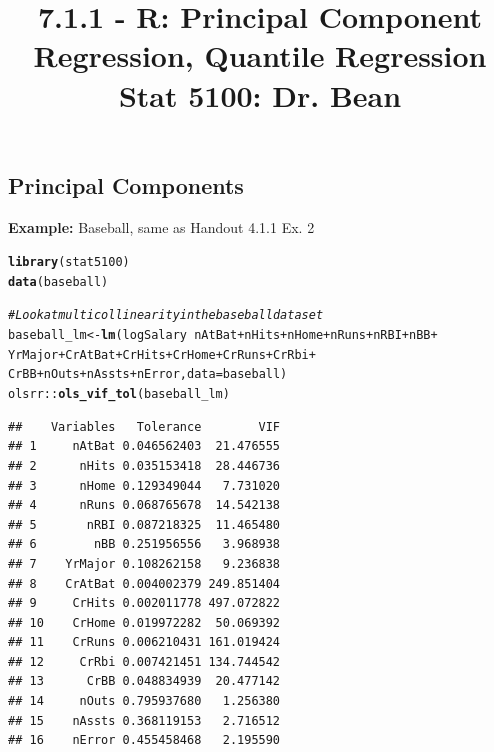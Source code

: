 \documentclass{article}\usepackage[]{graphicx}\usepackage[]{color}
\makeatletter
\newcommand{\hlcom}[1]{\textcolor[rgb]{0.678,0.584,0.686}{\textit{#1}}}%
\newcommand{\hlopt}[1]{\textcolor[rgb]{0,0,0}{#1}}%
\newcommand{\hlstd}[1]{\textcolor[rgb]{0.345,0.345,0.345}{#1}}%
\newcommand{\hlkwb}[1]{\textcolor[rgb]{0.69,0.353,0.396}{#1}}%
\newcommand{\hlkwc}[1]{\textcolor[rgb]{0.333,0.667,0.333}{#1}}%
\newcommand{\hlkwd}[1]{\textcolor[rgb]{0.737,0.353,0.396}{\textbf{#1}}}%
\newenvironment{kframe}{%
 \def\at@end@of@kframe{}%
 \ifinner\ifhmode%
  \def\at@end@of@kframe{\end{minipage}}%
  \begin{minipage}{\columnwidth}%
 \fi\fi%
 \def\FrameCommand##1{\hskip\@totalleftmargin \hskip-\fboxsep
 \colorbox{shadecolor}{##1}\hskip-\fboxsep
     \hskip-\linewidth \hskip-\@totalleftmargin \hskip\columnwidth}%
 \MakeFramed {\advance\hsize-\width
   \@totalleftmargin\z@ \linewidth\hsize
   \@setminipage}}%
 {\par\unskip\endMakeFramed%
 \at@end@of@kframe}
\newenvironment{knitrout}{}{} %
\makeatother
\begin{document}
\title{%
  7.1.1 - R: Principal Component Regression, Quantile Regression \\
  \smallskip
  \large Stat 5100: Dr. Bean
}
\date{}

\maketitle

\subsection{Principal Components}

\textbf{Example:} Baseball, same as Handout 4.1.1 Ex. 2

\begin{knitrout}
\color{fgcolor}\begin{kframe}
\begin{alltt}
\hlkwd{library}\hlstd{(stat5100)}
\hlkwd{data}\hlstd{(baseball)}

\hlcom{# Look at multicollinearity in the baseball dataset}
\hlstd{baseball_lm} \hlkwb{<-} \hlkwd{lm}\hlstd{(logSalary} \hlopt{~} \hlstd{nAtBat} \hlopt{+} \hlstd{nHits} \hlopt{+} \hlstd{nHome} \hlopt{+} \hlstd{nRuns} \hlopt{+} \hlstd{nRBI} \hlopt{+} \hlstd{nBB} \hlopt{+}
                    \hlstd{YrMajor} \hlopt{+} \hlstd{CrAtBat} \hlopt{+} \hlstd{CrHits} \hlopt{+} \hlstd{CrHome} \hlopt{+} \hlstd{CrRuns} \hlopt{+} \hlstd{CrRbi} \hlopt{+}
                    \hlstd{CrBB} \hlopt{+} \hlstd{nOuts} \hlopt{+} \hlstd{nAssts} \hlopt{+} \hlstd{nError,} \hlkwc{data} \hlstd{= baseball)}
\hlstd{olsrr}\hlopt{::}\hlkwd{ols_vif_tol}\hlstd{(baseball_lm)}
\end{alltt}
\begin{verbatim}
##    Variables   Tolerance        VIF
## 1     nAtBat 0.046562403  21.476555
## 2      nHits 0.035153418  28.446736
## 3      nHome 0.129349044   7.731020
## 4      nRuns 0.068765678  14.542138
## 5       nRBI 0.087218325  11.465480
## 6        nBB 0.251956556   3.968938
## 7    YrMajor 0.108262158   9.236838
## 8    CrAtBat 0.004002379 249.851404
## 9     CrHits 0.002011778 497.072822
## 10    CrHome 0.019972282  50.069392
## 11    CrRuns 0.006210431 161.019424
## 12     CrRbi 0.007421451 134.744542
## 13      CrBB 0.048834939  20.477142
## 14     nOuts 0.795937680   1.256380
## 15    nAssts 0.368119153   2.716512
## 16    nError 0.455458468   2.195590
\end{verbatim}
\end{kframe}
\end{knitrout}
\end{document}
